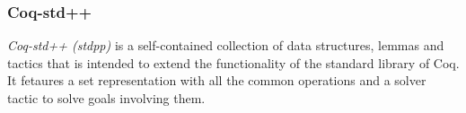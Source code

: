 \subsubsection{Coq-std++}

\emph{Coq-std++ (stdpp)} is a self-contained collection of data structures, lemmas and tactics that is intended to extend the functionality of the standard library of Coq. It fetaures a set representation with all the common operations and a solver tactic to solve goals involving them.

